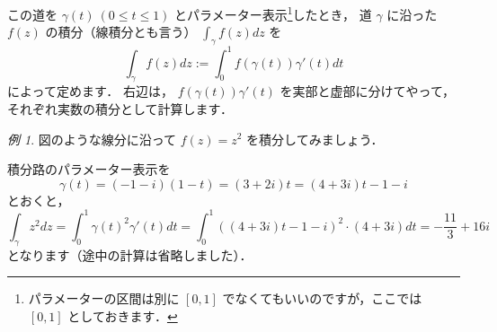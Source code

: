 \documentclass{ltjsarticle}
\newcommand{\Complex}{\mathbf{C}}
\theoremstyle{definition}
\theoremstyle{remark}
\newtheorem{example}{例}
\begin{document}
この道を
$\gamma(t) \ (0\le t\le 1)$
とパラメーター表示\footnote{パラメーターの区間は別に $[0,1]$ でなくてもいいのですが，ここでは $[0,1]$ としておきます．}したとき，
道 $\gamma$ に沿った $f(z)$ の積分（線積分とも言う） $\int_\gamma f(z)dz$ を
\[\int_\gamma f(z)dz:=\int_0^1 f(\gamma(t))\gamma'(t)dt\]
によって定めます．
右辺は， $f(\gamma(t))\gamma'(t)$ を実部と虚部に分けてやって，それぞれ実数の積分として計算します．


\begin{example}
  図のような線分に沿って $f(z)=z^2$ を積分してみましょう．
  \begin{center}
  \end{center}
  積分路のパラメーター表示を
  \[\gamma(t)=(-1-i)(1-t)=(3+2i)t=(4+3i)t-1-i\]
  とおくと，
  \[
  \int_\gamma z^2dz
  =\int_0^1 \gamma(t)^2\gamma'(t)dt
  =\int_0^1 ((4+3i)t-1-i)^2\cdot(4+3i) dt
  =-\frac{11}{3}+16i
  \]
  となります（途中の計算は省略しました）．
\end{example}
\end{document}

